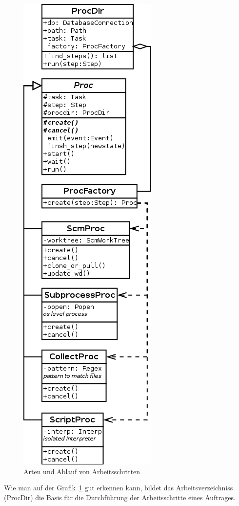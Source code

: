 \begin{figure}[!ht]
  \centering
  \includegraphics[height=0.8\textheight]{imageinput/klassen-arten-arbeitsschritt.png}
  \caption{Arten und Ablauf von Arbeitsschritten}
  \label{fig:klassen-arten-arbeitsschritt}
\end{figure}

Wie man auf der Grafik~\ref{fig:klassen-arten-arbeitsschritt} gut erkennen kann,
bildet das Arbeitsverzeichniss (ProcDir) die Basis
für die Durchführung der Arbeitsschritte eines Auftrages.

